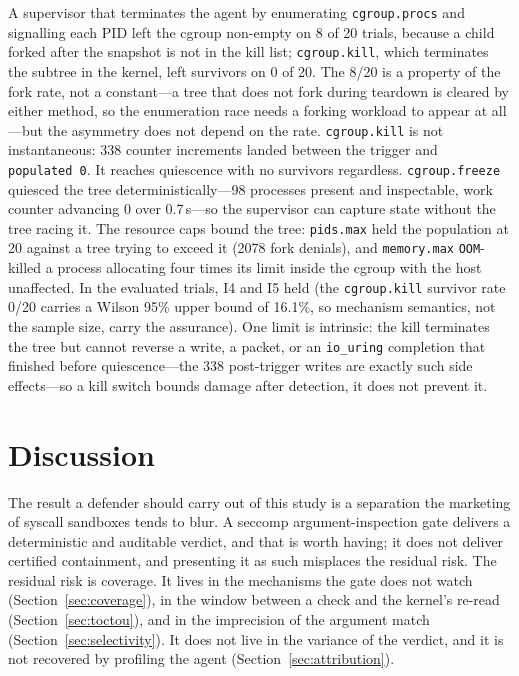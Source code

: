 \documentclass[11pt]{article}
\begin{document}
A supervisor that terminates the agent by enumerating \texttt{cgroup.procs} and signalling each PID left
the cgroup non-empty on 8 of 20 trials, because a child forked after the snapshot is not in the kill
list; \texttt{cgroup.kill}, which terminates the subtree in the kernel, left survivors on 0 of 20. The
8/20 is a property of the fork rate, not a constant---a tree that does not fork during teardown is cleared
by either method, so the enumeration race needs a forking workload to appear at all---but the asymmetry
does not depend on the rate. \texttt{cgroup.kill} is not instantaneous: 338 counter increments landed
between the trigger and \texttt{populated~0}. It reaches quiescence with no survivors regardless.
\texttt{cgroup.freeze} quiesced the tree deterministically---98 processes present and inspectable, work
counter advancing 0 over 0.7\,s---so the supervisor can capture state without the tree racing it. The
resource caps bound the tree: \texttt{pids.max} held the population at 20 against a tree trying to exceed
it (2078 fork denials), and \texttt{memory.max} \texttt{OOM}-killed a process allocating four times its
limit inside the cgroup with the host unaffected. In the evaluated trials, I4 and I5 held (the
\texttt{cgroup.kill} survivor rate 0/20 carries a Wilson 95\% upper bound of 16.1\%, so mechanism
semantics, not the sample size, carry the assurance). One limit is intrinsic: the kill terminates the
tree but cannot reverse a write, a packet, or an \texttt{io\_uring} completion that finished before
quiescence---the 338 post-trigger writes are exactly such side effects---so a kill switch bounds damage
after detection, it does not prevent it.

\section{Discussion}\label{sec:discussion}

The result a defender should carry out of this study is a separation the marketing of syscall sandboxes
tends to blur. A seccomp argument-inspection gate delivers a deterministic and auditable verdict, and that
is worth having; it does not deliver certified containment, and presenting it as such misplaces the
residual risk. The residual risk is coverage. It lives in the mechanisms the gate does not watch
(Section~\ref{sec:coverage}), in the window between a check and the kernel's re-read
(Section~\ref{sec:toctou}), and in the imprecision of the argument match (Section~\ref{sec:selectivity}).
It does not live in the variance of the verdict, and it is not recovered by profiling the agent
(Section~\ref{sec:attribution}).
\end{document}
